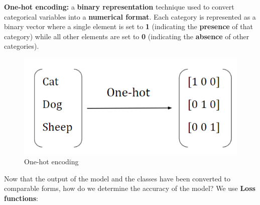 \begin{definition}
    \textbf{One-hot encoding:}  a \textbf{binary representation} technique used to convert categorical variables into a \textbf{numerical format}. Each category is represented as a binary vector where a single element is set to \textbf{1} (indicating the \textbf{presence} of that category) while all other elements are set to \textbf{0} (indicating the \textbf{absence} of other categories).
\end{definition}
\begin{figure}[h!t]
    \centering
    \includegraphics[width=0.25\linewidth]{onehotencoding.png}
    \caption{One-hot encoding}
    \label{fig:enter-label}
\end{figure}
Now that the output of the model and the classes have been converted to comparable forms, how do we determine the accuracy of the model? We use \textbf{Loss functions}:
